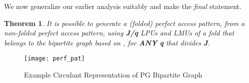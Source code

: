 \documentclass[12pt]{article}
\newtheorem{thm}{Theorem}
\begin{document}
We now generalize our earlier analysis suitably and make the \textit{final}
statement.
\begin{thm}
\label{th1}
It is possible to generate a (folded) perfect access
pattern, from a non-folded perfect access pattern, using \textbf{J/q}
LPUs and LMUs of a fold that belongs to the bipartite
graph based on , for \textbf{ANY}
\textbf{q} that divides \textbf{J}.
\end{thm}

\begin{figure}[h]
\begin{center}
\texttt{[image: perf\_pat]}
\end{center}
\caption{Example Circulant Representation of PG Bipartite Graph}
\label{perf_pat}
\end{figure}
\end{document}
